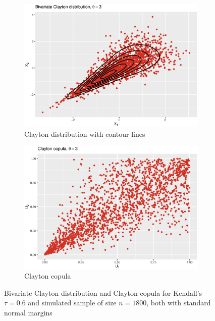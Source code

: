  \begin{figure}[H]
\centering
\begin{subfigure}{.45\textwidth}
  \centering
  \includegraphics[width=\linewidth]{figures/bivariate_clayton.eps}
  \caption{Clayton distribution with contour lines}
  \label{fig:bivariate_clayton}
\end{subfigure}
\begin{subfigure}{.45\textwidth}
  \centering
  \includegraphics[width=\linewidth]{figures/clayton_copula.eps}
  \caption{Clayton copula}
  \label{fig:clayton_copula}
\end{subfigure}
\caption{Bivariate Clayton distribution and Clayton copula for Kendall's $\tau = 0.6$ and simulated sample of size $n = 1800$, both with standard normal margins}
\label{fig:clayton_plots}
\end{figure}




